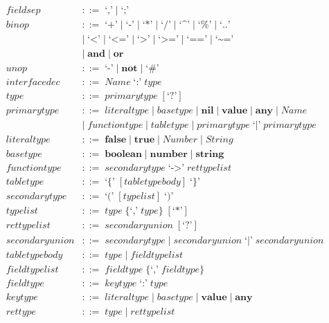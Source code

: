 \begin{align*}
\textit{fieldsep} & ::= \; \texttt{`,'} \; | \; \texttt{`;'}\\
\textit{binop} & ::= \; \texttt{`+'} \; | \; \texttt{`-'} \; | \; \texttt{`*'} \; | \; \texttt{`/'} \; | \;
  \texttt{`\textasciicircum'} \; | \; \texttt{`\%'} \; | \; \texttt{`..'}\\
& | \; \texttt{`<'} \; | \; \texttt{`<='} \; | \; \texttt{`>'} \; | \; \texttt{`>='} \; | \;
  \texttt{`=='} \; | \; \texttt{`\textasciitilde='}\\
& | \; \textbf{and} \; | \; \textbf{or}\\
\textit{unop} & ::= \; \texttt{`-'} \; | \; \textbf{not} \; | \; \texttt{`\#'}\\
\textit{interfacedec} & ::= \; \textit{Name} \; \texttt{`:'} \; \textit{type}\\
\textit{type} & ::= \; \textit{primarytype} \; [\texttt{`?'}]\\
\textit{primarytype} & ::= \; \textit{literaltype} \; | \;
  \textit{basetype} \; | \;
  \textbf{nil} \; | \;
  \textbf{value} \; | \;
  \textbf{any} \; | \;
  \textit{Name}\\
& | \; \textit{functiontype} \; | \;
  \textit{tabletype} \; | \;
  \textit{primarytype} \; \texttt{`|'} \; \textit{primarytype}\\
\textit{literaltype} & ::= \; \textbf{false} \; | \;
  \textbf{true} \; | \;
  \textit{Number} \; | \;
  \textit{String}\\
\textit{basetype} & ::= \; \textbf{boolean} \; | \;
  \textbf{number} \; | \;
  \textbf{string}\\
\textit{functiontype} & ::= \; \textit{secondarytype} \; \texttt{`->'} \; \textit{rettypelist}\\
\textit{tabletype} & ::= \; \texttt{`\{'} \; [\textit{tabletypebody}] \; \texttt{`\}'}\\
\textit{secondarytype} & ::= \; \texttt{`('} \; [typelist] \; \texttt{`)'}\\
\textit{typelist} & ::= \; \textit{type} \; \{\texttt{`,'} \; \textit{type}\} \; [\texttt{`*'}]\\
\textit{rettypelist} & ::= \; \textit{secondaryunion} \; [\texttt{`?'}]\\
\textit{secondaryunion} & ::= \; \textit{secondarytype} \; | \;
  \textit{secondaryunion} \; \texttt{`|'} \; \textit{secondaryunion}\\
\textit{tabletypebody} & ::= \; \textit{type} \; | \; \textit{fieldtypelist}\\
\textit{fieldtypelist} & ::= \; \textit{fieldtype} \; \{\texttt{`,'} \; \textit{fieldtype}\}\\ 
\textit{fieldtype} & ::= \; \textit{keytype} \; \texttt{`:'} \; \textit{type}\\
\textit{keytype} & ::= \; \textit{literaltype} \; | \;
  \textit{basetype} \; | \;
  \textbf{value} \; | \;
  \textbf{any}\\
\textit{rettype} & ::= \; \textit{type} \; | \; \textit{rettypelist}\\
\end{align*}
